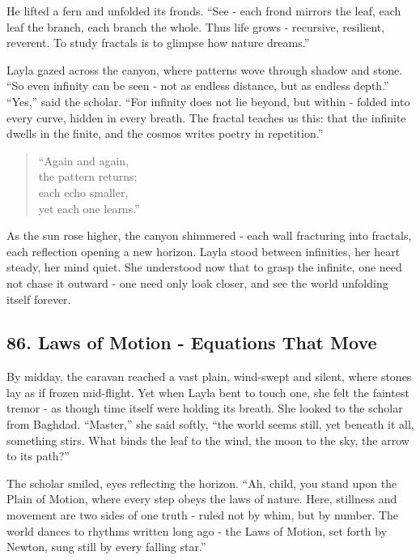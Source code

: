\documentclass[
  letterpaper,
  DIV=11,
  numbers=noendperiod]{scrreprt}
\begin{document}
He lifted a fern and unfolded its fronds. ``See - each frond mirrors the
leaf, each leaf the branch, each branch the whole. Thus life grows -
recursive, resilient, reverent. To study fractals is to glimpse how
nature dreams.''

Layla gazed across the canyon, where patterns wove through shadow and
stone. ``So even infinity can be seen - not as endless distance, but as
endless depth.'' ``Yes,'' said the scholar. ``For infinity does not lie
beyond, but within - folded into every curve, hidden in every breath.
The fractal teaches us this: that the infinite dwells in the finite, and
the cosmos writes poetry in repetition.''

\begin{quote}
``Again and again,\\
the pattern returns;\\
each echo smaller,\\
yet each one learns.''
\end{quote}

As the sun rose higher, the canyon shimmered - each wall fracturing into
fractals, each reflection opening a new horizon. Layla stood between
infinities, her heart steady, her mind quiet. She understood now that to
grasp the infinite, one need not chase it outward - one need only look
closer, and see the world unfolding itself forever.

\subsection{86. Laws of Motion - Equations That
Move}\label{laws-of-motion---equations-that-move}

By midday, the caravan reached a vast plain, wind-swept and silent,
where stones lay as if frozen mid-flight. Yet when Layla bent to touch
one, she felt the faintest tremor - as though time itself were holding
its breath. She looked to the scholar from Baghdad. ``Master,'' she said
softly, ``the world seems still, yet beneath it all, something stirs.
What binds the leaf to the wind, the moon to the sky, the arrow to its
path?''

The scholar smiled, eyes reflecting the horizon. ``Ah, child, you stand
upon the Plain of Motion, where every step obeys the laws of nature.
Here, stillness and movement are two sides of one truth - ruled not by
whim, but by number. The world dances to rhythms written long ago - the
Laws of Motion, set forth by Newton, sung still by every falling star.''
\end{document}
